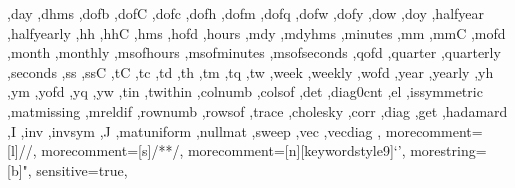 {{    ,day
    ,dhms
    ,dofb
    ,dofC
    ,dofc
    ,dofh
    ,dofm
    ,dofq
    ,dofw
    ,dofy
    ,dow
    ,doy
    ,halfyear
    ,halfyearly
    ,hh
    ,hhC
    ,hms
    ,hofd
    ,hours
    ,mdy
    ,mdyhms
    ,minutes
    ,mm
    ,mmC
    ,mofd
    ,month
    ,monthly
    ,msofhours
    ,msofminutes
    ,msofseconds
    ,qofd
    ,quarter
    ,quarterly
    ,seconds
    ,ss
    ,ssC
    ,tC
    ,tc
    ,td
    ,th
    ,tm
    ,tq
    ,tw
    ,week
    ,weekly
    ,wofd
    ,year
    ,yearly
    ,yh
    ,ym
    ,yofd
    ,yq
    ,yw
    ,tin
    ,twithin
    ,colnumb
    ,colsof
    ,det
    ,diag0cnt
    ,el
    ,issymmetric
    ,matmissing
    ,mreldif
    ,rownumb
    ,rowsof
    ,trace
    ,cholesky
    ,corr
    ,diag
    ,get
    ,hadamard
    ,I
    ,inv
    ,invsym
    ,J
    ,matuniform
    ,nullmat
    ,sweep
    ,vec
    ,vecdiag
  },
  morecomment=[l]{//},
  morecomment=[s]{/*}{*/},
  morecomment=[n][keywordstyle9]{`}{'},
  morestring=[b]",
  sensitive=true,
}


